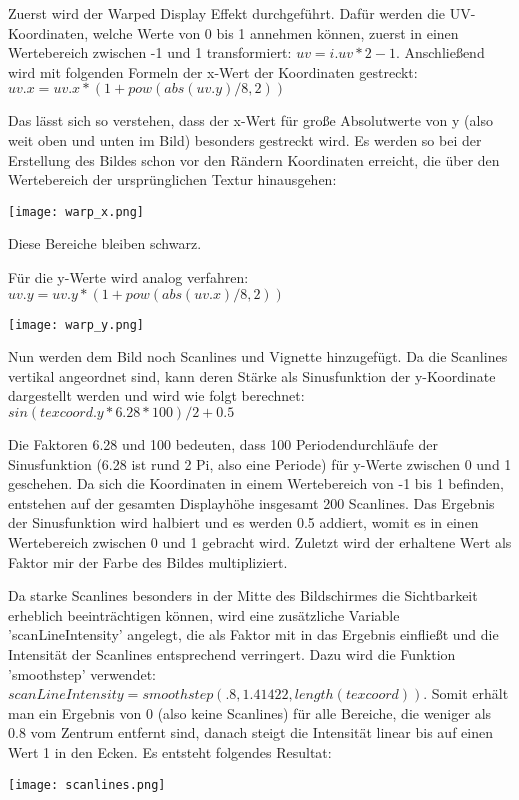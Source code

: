 Zuerst wird der Warped Display Effekt durchgeführt. Dafür werden die UV-Koordinaten, welche Werte von 0 bis 1 annehmen können, zuerst in einen Wertebereich zwischen -1 und 1 transformiert: $uv = i.uv * 2 - 1$.
Anschlie{\ss}end wird mit folgenden Formeln der x-Wert der Koordinaten gestreckt: $uv.x = uv.x * (1 + pow(abs(uv.y) / 8, 2))$

Das lässt sich so verstehen, dass der x-Wert für gro{\ss}e Absolutwerte von y (also weit oben und unten im Bild) besonders gestreckt wird. Es werden so bei der Erstellung des Bildes schon vor den Rändern Koordinaten erreicht, die über den Wertebereich der ursprünglichen Textur hinausgehen:

\texttt{[image: warp\_x.png]}

Diese Bereiche bleiben schwarz.

Für die y-Werte wird analog verfahren: $uv.y = uv.y * (1 + pow(abs(uv.x) / 8, 2))$

\texttt{[image: warp\_y.png]}

Nun werden dem Bild noch Scanlines und Vignette hinzugefügt. Da die Scanlines vertikal angeordnet sind, kann deren Stärke als Sinusfunktion der y-Koordinate dargestellt werden und wird wie folgt berechnet: $sin(texcoord.y * 6.28 * 100) / 2 + 0.5$

Die Faktoren 6.28 und 100 bedeuten, dass 100 Periodendurchläufe der Sinusfunktion (6.28 ist rund 2 Pi, also eine Periode) für y-Werte zwischen 0 und 1 geschehen. Da sich die Koordinaten in einem Wertebereich von -1 bis 1 befinden, entstehen auf der gesamten Displayhöhe insgesamt 200 Scanlines. Das Ergebnis der Sinusfunktion wird halbiert und es werden 0.5 addiert, womit es in einen Wertebereich zwischen 0 und 1 gebracht wird. Zuletzt wird der erhaltene Wert als Faktor mir der Farbe des Bildes multipliziert.

Da starke Scanlines besonders in der Mitte des Bildschirmes die Sichtbarkeit erheblich beeinträchtigen können, wird eine zusätzliche Variable 'scanLineIntensity' angelegt, die als Faktor mit in das Ergebnis einflie{\ss}t und die Intensität der Scanlines entsprechend verringert. Dazu wird die Funktion 'smoothstep' verwendet: $scanLineIntensity = smoothstep(.8, 1.41422, length(texcoord))$. Somit erhält man ein Ergebnis von 0 (also keine Scanlines) für alle Bereiche, die weniger als 0.8 vom Zentrum entfernt sind, danach steigt die Intensität linear bis auf einen Wert 1 in den Ecken. Es entsteht folgendes Resultat:

\texttt{[image: scanlines.png]}

